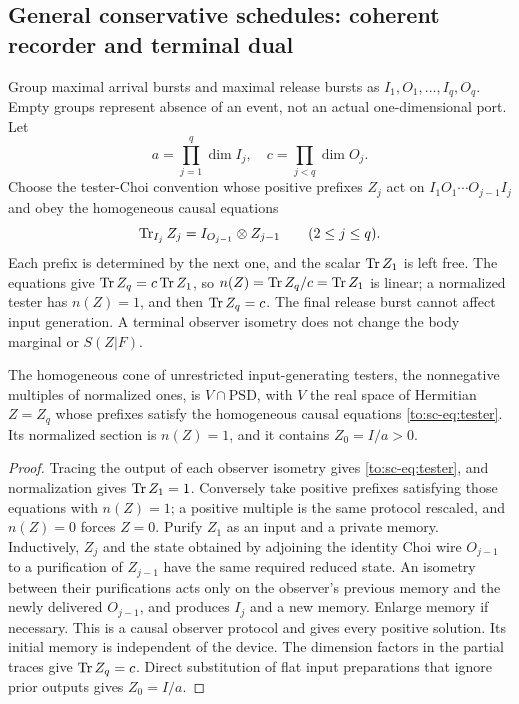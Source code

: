 \subsection{General conservative schedules: coherent recorder and terminal dual}
Group maximal arrival bursts and maximal release bursts as $I_1,O_1,\ldots,I_q,O_q$. Empty groups represent absence of an event, not an actual one-dimensional port. Let
\[
a=\prod_{j=1}^q\dim I_j,\quad
c=\prod_{j<q}\dim O_j.
\]
Choose the tester-Choi convention whose positive prefixes $Z_j$ act on $I_1O_1\cdots O_{j-1}I_j$ and obey the homogeneous causal equations
\begin{equation}\label{to:sc-eq:tester}
\operatorname{Tr}_{I_j}Z_j=I_{O_{j-1}}\otimes Z_{j-1}\qquad(2\le j\le q).
\end{equation}
Each prefix is determined by the next one, and the scalar $\operatorname{Tr} Z_1$ is left free. The equations give $\operatorname{Tr} Z_q=c\operatorname{Tr} Z_1$, so $n(Z)=\operatorname{Tr} Z_q/c=\operatorname{Tr} Z_1$ is linear; a normalized tester has $n(Z)=1$, and then $\operatorname{Tr} Z_q=c$. The final release burst cannot affect input generation. A terminal observer isometry does not change the body marginal or $S(Z|F)$.

\begin{lemma}\label{to:sc-lem:tester}
The homogeneous cone of unrestricted input-generating testers, the nonnegative multiples of normalized ones, is $V\cap\mathrm{PSD}$, with $V$ the real space of Hermitian $Z=Z_q$ whose prefixes satisfy the homogeneous causal equations \eqref{to:sc-eq:tester}. Its normalized section is $n(Z)=1$, and it contains $Z_0=I/a>0$.
\end{lemma}
\begin{proof}
Tracing the output of each observer isometry gives \eqref{to:sc-eq:tester}, and normalization gives $\operatorname{Tr} Z_1=1$. Conversely take positive prefixes satisfying those equations with $n(Z)=1$; a positive multiple is the same protocol rescaled, and $n(Z)=0$ forces $Z=0$. Purify $Z_1$ as an input and a private memory. Inductively, $Z_j$ and the state obtained by adjoining the identity Choi wire $O_{j-1}$ to a purification of $Z_{j-1}$ have the same required reduced state. An isometry between their purifications acts only on the observer's previous memory and the newly delivered $O_{j-1}$, and produces $I_j$ and a new memory. Enlarge memory if necessary. This is a causal observer protocol and gives every positive solution. Its initial memory is independent of the device. The dimension factors in the partial traces give $\operatorname{Tr} Z_q=c$. Direct substitution of flat input preparations that ignore prior outputs gives $Z_0=I/a$.
\end{proof}

